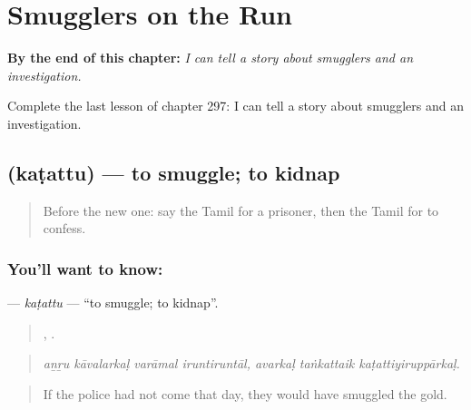 
\chapter{Smugglers on the Run}
\label{ch:ta-smugglers-on-the-run}

\begin{chapteropening}
\textbf{By the end of this chapter:} \emph{I can tell a story about smugglers and an investigation.}

Complete the last lesson of chapter 297: I can tell a story about smugglers and an investigation.
\end{chapteropening}

\section[\texorpdfstring{\ta{கடத்து} (kaṭattu)}{கடத்து (kaṭattu)}]{ (kaṭattu) — to smuggle; to kidnap}

\label{lesson:TA-C297-katattu}



\begin{quote}
Before the new one: say the Tamil for a prisoner, then the Tamil for to confess.
\end{quote}

\subsection*{You'll want to know: }
\textbf{} — \emph{kaṭattu} — \textquotedblleft{}to smuggle; to kidnap\textquotedblright{}.

\begin{quote}
   ,   .
\end{quote}

\begin{quote}
\emph{aṉṟu kāvalarkaḷ varāmal iruntiruntāl, avarkaḷ taṅkattaik kaṭattiyiruppārkaḷ.}
\end{quote}

\begin{quote}
If the police had not come that day, they would have smuggled the gold.
\end{quote}

